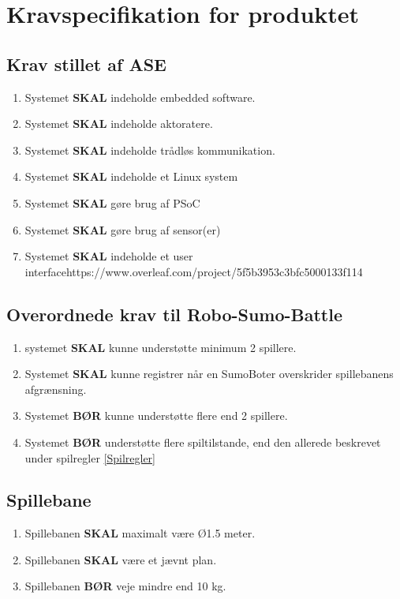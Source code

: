 \section{Kravspecifikation for produktet}



\subsection{Krav stillet af ASE}
\begin{enumerate}
    \item Systemet \textbf{SKAL} indeholde embedded software.
    \item Systemet \textbf{SKAL} indeholde aktoratere.
    \item Systemet \textbf{SKAL} indeholde trådløs kommunikation.
    \item Systemet \textbf{SKAL} indeholde et Linux system
    \item Systemet \textbf{SKAL} gøre brug af PSoC
    \item Systemet \textbf{SKAL} gøre brug af sensor(er)
    \item Systemet \textbf{SKAL} indeholde et user interfacehttps://www.overleaf.com/project/5f5b3953c3bfc5000133f114
    
\end{enumerate}

\subsection{Overordnede krav til Robo-Sumo-Battle}
\begin{enumerate}
    \item systemet \textbf{SKAL} kunne understøtte minimum 2 spillere.
    \item Systemet \textbf{SKAL} kunne registrer når en SumoBoter overskrider spillebanens afgrænsning.
    \item Systemet \textbf{BØR} kunne understøtte flere end 2 spillere.  
    \item Systemet \textbf{BØR} understøtte flere spiltilstande, end den allerede beskrevet under spilregler \ref{Spilregler}
\end{enumerate}

\subsection{Spillebane}
\begin{enumerate}
    \item Spillebanen \textbf{SKAL} maximalt være Ø1.5 meter.
    \item Spillebanen \textbf{SKAL} være et jævnt plan.
    \item Spillebanen \textbf{BØR} veje mindre end 10 kg.
\end{enumerate}

